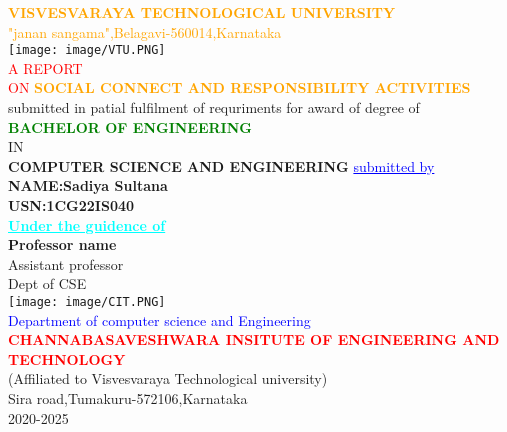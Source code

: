 \documentclass[12pt,a4paper]{article}
\begin{document}
    \begin{center}
        \textcolor{orange}{\large\textbf{VISVESVARAYA TECHNOLOGICAL UNIVERSITY}\\"janan sangama",Belagavi-560014,Karnataka}\\
        \vspace{2mm}
        \texttt{[image: image/VTU.PNG]}\\
        \vspace{2mm}
        \textcolor{red}{ A REPORT}\\
        \textcolor{red}{ON}
        \textcolor{orange}{\textbf{SOCIAL CONNECT AND RESPONSIBILITY ACTIVITIES}}\\
        \small{submitted in patial fulfilment of requriments for award of degree of}\\
        \vspace{5mm}
        \textcolor{green}{\textbf{BACHELOR OF ENGINEERING}}\\
        IN\\
        \textbf{COMPUTER SCIENCE AND ENGINEERING}
        \vspace{5mm}
        \textcolor{blue}{\underline{submitted by}}\\
        \textbf{NAME:Sadiya Sultana}\\
        \textbf{USN:1CG22IS040}\\
        \vspace{5mm}
        \textcolor{cyan}{\underline{{\textbf{Under the guidence of}}}}\\
        \large\textbf{Professor name}\\
        Assistant professor\\
        Dept of CSE\\
        \centering\texttt{[image: image/CIT.PNG]}\\
        \textcolor{blue}{Department of computer science and Engineering}
        \textcolor{red}{\textbf{CHANNABASAVESHWARA INSITUTE OF ENGINEERING AND TECHNOLOGY}}\\
        (Affiliated to Visvesvaraya Technological university)\\
        Sira road,Tumakuru-572106,Karnataka\\
        2020-2025
    \end{center}
\end{document}
